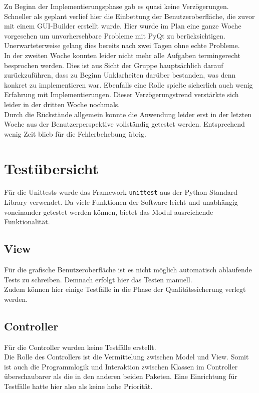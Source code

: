 \documentclass{article}
\begin{document}
Zu Beginn der Implementierungsphase gab es quasi keine Verzögerungen. Schneller als geplant verlief hier die Einbettung der Benutzeroberfläche, die zuvor mit einem GUI-Builder erstellt wurde. Hier wurde im Plan eine ganze Woche vorgesehen um unvorhersehbare Probleme mit \gls{PyQt} zu berücksichtigen. Unerwarteterweise gelang dies bereits nach zwei Tagen ohne echte Probleme.\\

In der zweiten Woche konnten leider nicht mehr alle Aufgaben termingerecht besprochen werden. Dies ist aus Sicht der Gruppe hauptsächlich darauf zurückzuführen, dass zu Beginn Unklarheiten darüber bestanden, was denn konkret zu implementieren war. Ebenfalls eine Rolle spielte sicherlich auch wenig Erfahrung mit Implementierungen.
Dieser Verzögerungstrend verstärkte sich leider in der dritten Woche nochmals.\\

Durch die Rückstände allgemein konnte die Anwendung leider erst in der letzten Woche aus der Benutzerperspektive vollständig getestet werden. Entsprechend wenig Zeit blieb für die Fehlerbehebung übrig.\\

\newpage
\section{Testübersicht}

Für die Unittests wurde das Framework \texttt{unittest} aus der Python Standard Library verwendet. Da viele Funktionen der Software leicht und unabhängig voneinander getestet werden können, bietet das Modul ausreichende Funktionalität.

\subsection{View}
Für die grafische Benutzeroberfläche ist es nicht möglich automatisch ablaufende Tests zu schreiben. Demnach erfolgt hier das Testen manuell. \\
Zudem können hier einige Testfälle in die Phase der Qualitätssicherung verlegt werden.

\subsection{Controller}
Für die Controller wurden keine Testfälle erstellt. \\
Die Rolle des Controllers ist die Vermittelung zwischen Model und View. Somit ist auch die Programmlogik und Interaktion zwischen Klassen im Controller überschaubarer als die in den anderen beiden Paketen. Eine Einrichtung für Testfälle hatte hier also als keine hohe Priorität.
\end{document}
